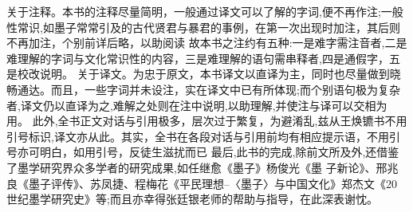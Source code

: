\documentclass[12pt,UTF8]{ctexbook}
\begin{document}
关于注释。本书的注释尽量简明，一般通过译文可以了解的字词,便不再作注;一般性常识,如墨子常常引及的古代贤君与暴君的事例，在第一次出现时加注，其后则不再加注，个别前详后略，以助阅读
故本书之注约有五种:一是难字需注音者,二是难理解的字词与文化常识性的内容，三是难理解的语句需串释者,四是通假字，五是校改说明。
关于译文。为忠于原文，本书译文以直译为主，同时也尽量做到晓畅通达。而且，一些字词并未设注，实在译文中已有所体现;而个别语句极为复杂者,译文仍以直译为之,难解之处则在注中说明,以助理解,并使注与译可以交相为用。
此外,全书正文对话与引用极多，层次过于繁复，为避淆乱,兹从王焕镳书不用引号标识,译文亦从此。其实，全书在各段对话与引用前均有相应提示语，不用引号亦可明白，如用引号，反徒生滋扰而已
最后,此书的完成,除前文所及外,还借鉴了墨学研究界众多学者的研究成果,如任继愈《墨子》杨俊光《墨
子新论》、邢兆 良《墨子评传》、苏凤捷、程梅花《平民理想--〈墨子〉与中国文化》郑杰文《20 世纪墨学研究史》等;而且亦幸得张廷银老师的帮助与指导，在此深表谢忱。
\end{document}
